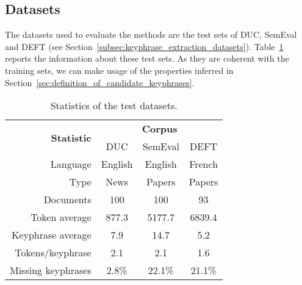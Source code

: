   \subsection{Datasets}
  \label{subsec:datasets}
    The datasets used to evaluate the methods are the test sets of DUC,
    SemEval and DEFT (see Section~\ref{subsec:keyphrase_extraction_datasets}).
    Table~\ref{tab:test_dataset_statistics} reports the information about these
    test sets. As they are coherent with the training sets, we can make usage of
    the properties inferred in
    Section~\ref{sec:definition_of_candidate_keyphrases}.
    \begin{table}
      \centering
      \begin{tabular}{@{~}r@{~}c@{~}c@{~}c@{~}}
        \toprule
        \multirow{2}{*}[-2pt]{\textbf{Statistic}} & \multicolumn{3}{c}{\textbf{Corpus}}\\
        \cmidrule{2-4}
        & DUC & SemEval & DEFT\\
        \midrule
        Language & English & English & French\\
        Type & News & Papers & Papers\\
        Documents & 100 & 100 & 93\\
        Token average & 877.3 & 5177.7 & 6839.4\\
        Keyphrase average & 7.9 & 14.7 & 5.2\\
        Tokens/keyphrase & 2.1 & 2.1 & 1.6\\
        Missing keyphrases & 2.8\% & 22.1\% & 21.1\% \\
        \bottomrule
      \end{tabular}
      \caption{Statistics of the test datasets.
               \label{tab:test_dataset_statistics}}
    \end{table}

